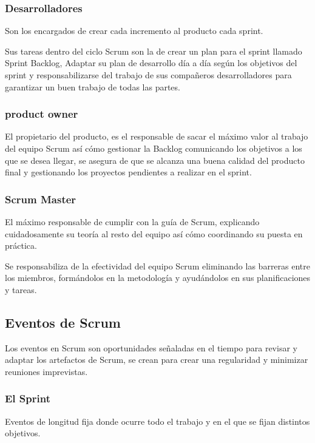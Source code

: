 \subsubsection{Desarrolladores}

Son los encargados de crear cada incremento al producto cada sprint.

Sus tareas dentro del ciclo Scrum son la de crear un plan para el sprint llamado Sprint Backlog, Adaptar su plan de desarrollo día a día según los objetivos del sprint y responsabilizarse del trabajo de sus compañeros desarrolladores para garantizar un buen trabajo de todas las partes.

\subsubsection{product owner}

El propietario del producto, es el responsable de sacar el máximo valor al trabajo del equipo Scrum así cómo gestionar la Backlog comunicando los objetivos a los que se desea llegar, se asegura de que se alcanza una buena calidad del producto final y gestionando los proyectos pendientes a realizar en el sprint.

\subsubsection{Scrum Master}

El máximo responsable de cumplir con la guía de Scrum, explicando cuidadosamente su teoría al resto del equipo así cómo coordinando su puesta en práctica.

Se responsabiliza de la efectividad del equipo Scrum eliminando las barreras entre los miembros, formándolos en la metodología y ayudándolos en sus planificaciones y tareas.


\subsection{Eventos de Scrum}

Los eventos en Scrum son oportunidades señaladas en el tiempo para revisar y adaptar los artefactos de Scrum, se crean para crear una regularidad y minimizar reuniones imprevistas.

\subsubsection{El Sprint}

Eventos de longitud fija donde ocurre todo el trabajo y en el que se fijan distintos objetivos.

